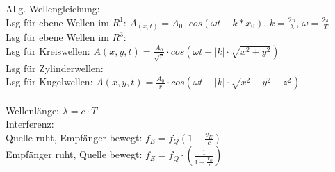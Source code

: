 \documentclass[A4]{scrreprt}
\begin{document}
  
  Allg. Wellengleichung:\\
  Lsg für ebene Wellen im $R^1$: $A_{(x,t)} = A_0\cdot cos(\omega t - k*x_0)$, $k = \frac{2\pi}{\lambda}$, $\omega = \frac{2\pi}{T}$\\
  Lsg für ebene Wellen im $R^3$: \\
  Lsg für Kreiswellen: $A(x,y,t) = \frac{A_0}{\sqrt{r}}\cdot cos(\omega t - |k|\cdot\sqrt{x^2+y^2})$\\
  Lsg für Zylinderwellen: \\
  Lsg für Kugelwellen: $A(x,y,t) = \frac{A_0}{r}\cdot cos(\omega t - |k|\cdot \sqrt{x^2+y^2+z^2})$\\
  \\
  Wellenlänge: $\lambda = c\cdot T$\\  

  Interferenz:\\

  Quelle ruht, Empfänger bewegt: $f_E = f_Q (1-\frac{v_E}{c})$\\
  Empfänger ruht, Quelle bewegt: $f_E = f_Q\cdot(\frac{1}{1-\frac{V_Q}{c}})$\\

  \addsec{}
       
\end{document}

